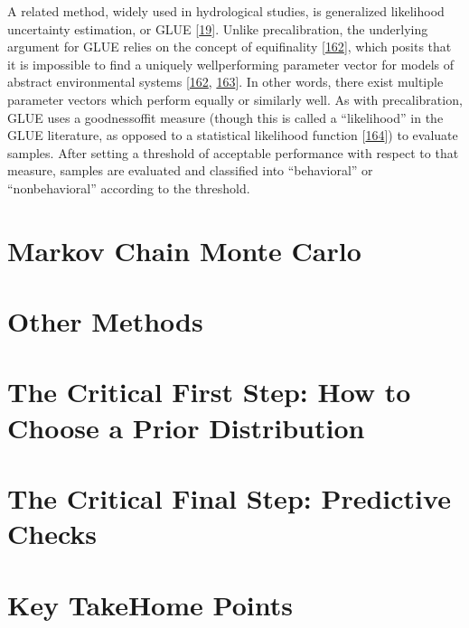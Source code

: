 \documentclass[letterpaper,10pt,english]{sphinxmanual}
\begin{document}
\sphinxAtStartPar
A related method, widely used in hydrological studies, is generalized likelihood uncertainty estimation, or GLUE {[}\hyperlink{cite.index:id38}{19}{]}. Unlike pre\sphinxhyphen{}calibration, the underlying argument for GLUE relies on the concept of equifinality {[}\hyperlink{cite.index:id43}{162}{]}, which posits that it is impossible to find a uniquely well\sphinxhyphen{}performing parameter vector for models of abstract environmental systems {[}\hyperlink{cite.index:id43}{162}, \hyperlink{cite.index:id44}{163}{]}. In other words, there exist multiple parameter vectors which perform equally or similarly well. As with pre\sphinxhyphen{}calibration, GLUE uses a goodness\sphinxhyphen{}of\sphinxhyphen{}fit measure (though this is called a “likelihood” in the GLUE literature, as opposed to a statistical likelihood function {[}\hyperlink{cite.index:id45}{164}{]}) to evaluate samples. After setting a threshold of acceptable performance with respect to that measure, samples are evaluated and classified into “behavioral” or “non\sphinxhyphen{}behavioral” according to the threshold.


\section{Markov Chain Monte Carlo}
\label{\detokenize{A1_Uncertainty_Quantification:markov-chain-monte-carlo}}

\section{Other Methods}
\label{\detokenize{A1_Uncertainty_Quantification:other-methods}}

\section{The Critical First Step: How to Choose a Prior Distribution}
\label{\detokenize{A1_Uncertainty_Quantification:the-critical-first-step-how-to-choose-a-prior-distribution}}

\section{The Critical Final Step: Predictive Checks}
\label{\detokenize{A1_Uncertainty_Quantification:the-critical-final-step-predictive-checks}}

\section{Key Take\sphinxhyphen{}Home Points}
\label{\detokenize{A1_Uncertainty_Quantification:key-take-home-points}}
\sphinxAtStartPar
\end{document}
